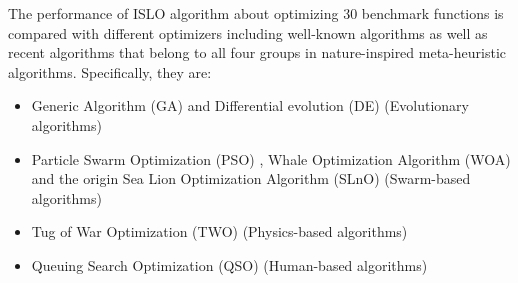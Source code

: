 \documentclass[a4paper,13pt,2p]{report}
\begin{document}
The performance of ISLO algorithm about optimizing 30 benchmark functions is compared with different optimizers including well-known algorithms as well as recent algorithms that belong to all four groups in nature-inspired meta-heuristic algorithms. Specifically, they are: 
\begin{itemize}
\item Generic Algorithm (GA) \cite{whitley1994genetic} and Differential evolution (DE) \cite{price2013differential} (Evolutionary algorithms)
\item Particle Swarm Optimization (PSO) \cite{kennedy2010particle}, Whale Optimization Algorithm (WOA) \cite{mirjalili2016whale} and the origin Sea Lion Optimization Algorithm (SLnO) \cite{masadeh2019sea} (Swarm-based algorithms)
\item Tug of War Optimization (TWO) \cite{kaveh2016novel} (Physics-based algorithms)
\item Queuing Search Optimization (QSO) \cite{zhang2018queuing} (Human-based algorithms)
\end{itemize}
\end{document}
